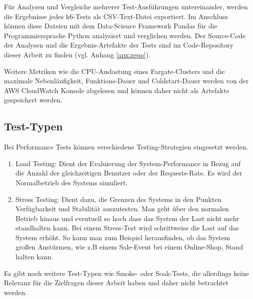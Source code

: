 Für Analysen und Vergleiche mehrerer Test-Ausführungen untereinander, werden die Ergebnisse jedes k6-Tests als CSV-Text-Datei exportiert. Im Anschluss können diese Dateien mit dem Data-Science Framework Pandas\cite{noauthor_pandas_nodate} für die Programmiersprache Python analysiert und verglichen werden. Der Source-Code der Analysen und die Ergebnis-Artefakte der Tests sind im Code-Repository dieser Arbeit zu finden (vgl. Anhang \ref{apx:repo}).

Weitere Metriken wie die CPU-Auslastung eines Fargate-Clusters und die maximale Nebenläufigkeit, Funktions-Dauer und Coldstart-Dauer werden von der AWS CloudWatch Konsole abgelesen und können daher nicht als Artefakte gespeichert werden.

\subsection{Test-Typen}
Bei Performance Tests können verschiedene Testing-Strategien eingesetzt werden.
\begin{enumerate}
    \item Load Testing: Dient der Evaluierung der System-Performance in Bezug auf die Anzahl der gleichzeitigen Benutzer oder der Requests-Rate. Es wird der Normalbetrieb des Systems simuliert\cite{noauthor_what_nodate}.
    
    \item Stress Testing: Dient dazu, die Grenzen des Systems in den Punkten Verfügbarkeit und  Stabilität auszutesten. Man geht über den normalen Betrieb hinaus und eventuell so hoch dass das System der Last nicht mehr standhalten kann. Bei einem Stress-Test wird schrittweise die Last auf das System erhöht. So kann man zum Beispiel herausfinden, ob das System großen Anstürmen, wie z.B einem Sale-Event bei einem Online-Shop, Stand halten kann\cite{noauthor_what_nodate-2}.
\end{enumerate}

Es gibt noch weitere Test-Typen wie Smoke- oder Soak-Tests, die allerdings keine Relevanz für die Zielfragen dieser Arbeit haben und daher nicht betrachtet werden.

